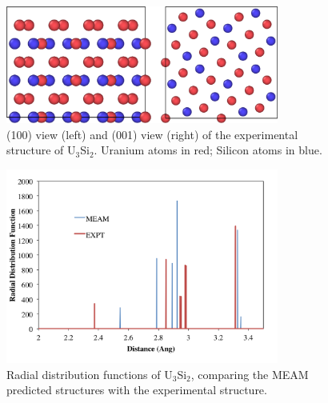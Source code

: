 \documentclass[review]{elsarticle}
\begin{document}
\begin{figure}[ht]
	\centering
	\includegraphics[width=0.8\textwidth]{ben1NEW.png}
    \caption{(100) view (left) and (001) view (right) of the experimental structure of U$_{3}$Si$_{2}$.  Uranium atoms in red; Silicon atoms in blue.}\label{fig:ben1}
\end{figure}  

\begin{figure}[ht]
	\centering
	\includegraphics[width=0.8\textwidth]{rdfKK1.png}
    \caption{Radial distribution functions of U$_{3}$Si$_{2}$, comparing the MEAM predicted structures with the experimental structure.}\label{fig:benrdf}
\end{figure}

\FloatBarrier
\end{document}
